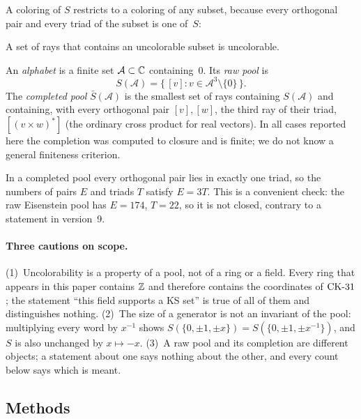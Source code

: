 A coloring of $S$ restricts to a coloring of any subset, because every orthogonal pair and every
triad of the subset is one of~$S$:

\begin{lemma}[Restriction]\label{lem:restrict}
A set of rays that contains an uncolorable subset is uncolorable.
\end{lemma}

\begin{definition}
An \emph{alphabet} is a finite set $\mathcal A\subset\mathbb{C}$ containing~0.  Its \emph{raw pool} is
\[
S(\mathcal A)=\{\,[v]: v\in\mathcal A^3\setminus\{0\}\,\}.
\]
The \emph{completed pool} $\bar S(\mathcal A)$ is the smallest set of rays containing
$S(\mathcal A)$ and containing, with every orthogonal pair $[v],[w]$, the third ray of their
triad, $[(v\times w)^{*}]$ (the ordinary cross product for real vectors).  In all cases reported
here the completion was computed to closure and is finite; we do not know a general finiteness
criterion.
\end{definition}

In a completed pool every orthogonal pair lies in exactly one triad, so the numbers of pairs $E$
and triads $T$ satisfy $E=3T$.  This is a convenient check: the raw Eisenstein pool has
$E=174$, $T=22$, so it is not closed, contrary to a statement in version~9.

\paragraph{Three cautions on scope.}
(1)~Uncolorability is a property of a pool, not of a ring or a field.  Every ring that appears in
this paper contains $\mathbb{Z}$ and therefore contains the coordinates of $\mathrm{CK}\text{-}31$; the statement ``this
field supports a KS set'' is true of all of them and distinguishes nothing.  (2)~The size of a
generator is not an invariant of the pool: multiplying every word by $x^{-1}$ shows
$S(\{0,\pm1,\pm x\})=S(\{0,\pm1,\pm x^{-1}\})$, and $S$ is also unchanged by $x\mapsto-x$.
(3)~A raw pool and its completion are different objects; a statement about one says nothing about
the other, and every count below says which is meant.

\subsection{Methods}\label{sec:methods}

